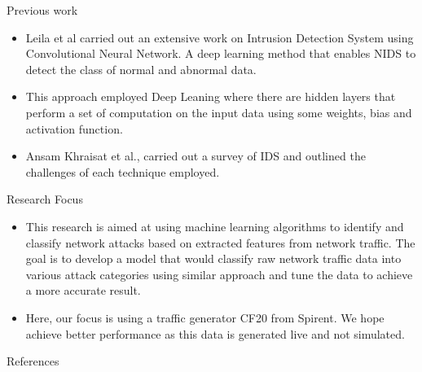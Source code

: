 \documentclass[pdf]
{beamer}
\begin{document}
\begin{frame}{Previous work}
    \begin{itemize}
        \item Leila et al carried out an extensive work on Intrusion Detection System using Convolutional Neural Network. A deep learning method that enables NIDS to detect the class of normal and abnormal data. 
        \item This approach employed Deep Leaning where there are hidden layers that perform a set of computation on the input data using some weights, bias and activation function.
        \item Ansam Khraisat et al., carried out a survey of IDS and outlined the challenges of each technique employed.\citep{Khraisat2019}

    \end{itemize}
\end{frame}

\begin{frame}{Research Focus}
    \begin{itemize}
        \item This research is aimed at using machine learning algorithms to identify and classify network attacks based on extracted features from network traffic. The goal is to develop a model that would classify raw network traffic data into various attack categories using similar approach and tune the data to achieve a more accurate result.
        \item Here, our focus is using a traffic generator CF20 from Spirent. We hope achieve better performance as this data is generated live and not simulated.
    \end{itemize}
\end{frame}

\begin{frame}{References}
    

\end{frame}
\end{document}
